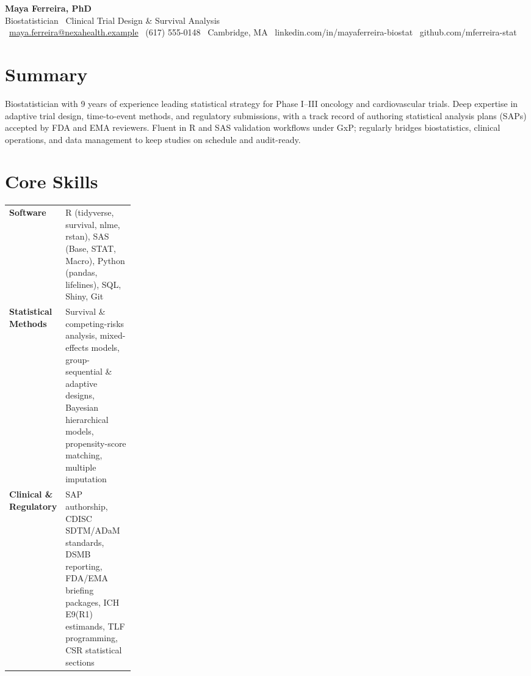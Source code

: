 \documentclass[9.5pt,letterpaper]{article}
\begin{document}
\begin{center}
  {\fontsize{19}{21}\selectfont\bfseries\color{inkynavy} Maya Ferreira, PhD}\\[2pt]
  {\normalsize\color{signalteal} Biostatistician \textbar\ Clinical Trial Design \& Survival Analysis}\\[3pt]
  {\small\color{slategray}
    \faEnvelope\ \href{mailto:maya.ferreira@nexahealth.example}{maya.ferreira@nexahealth.example} \quad
    \faPhone\ (617) 555-0148 \quad
    \faMapMarker\ Cambridge, MA \quad
    \faLinkedin\ linkedin.com/in/mayaferreira-biostat \quad
    \faGithub\ github.com/mferreira-stat
  }
\end{center}

\vspace{-8pt}

\section*{Summary}
Biostatistician with 9 years of experience leading statistical strategy for Phase I--III oncology
and cardiovascular trials. Deep expertise in adaptive trial design, time-to-event methods, and
regulatory submissions, with a track record of authoring statistical analysis plans (SAPs) accepted
by FDA and EMA reviewers. Fluent in R and SAS validation workflows under GxP; regularly bridges
biostatistics, clinical operations, and data management to keep studies on schedule and audit-ready.

\section*{Core Skills}
\begin{tabularx}{\linewidth}{@{}>{\raggedright\arraybackslash}p{0.24\linewidth}X@{}}
\textbf{\color{signalteal}Software} & R (tidyverse, survival, nlme, rstan), SAS (Base, STAT, Macro), Python (pandas, lifelines), SQL, Shiny, Git \\[1pt]
\textbf{\color{signalteal}Statistical Methods} & Survival \& competing-risks analysis, mixed-effects models, group-sequential \& adaptive designs, Bayesian hierarchical models, propensity-score matching, multiple imputation \\[1pt]
\textbf{\color{signalteal}Clinical \& Regulatory} & SAP authorship, CDISC SDTM/ADaM standards, DSMB reporting, FDA/EMA briefing packages, ICH E9(R1) estimands, TLF programming, CSR statistical sections \\
\end{tabularx}
\end{document}

